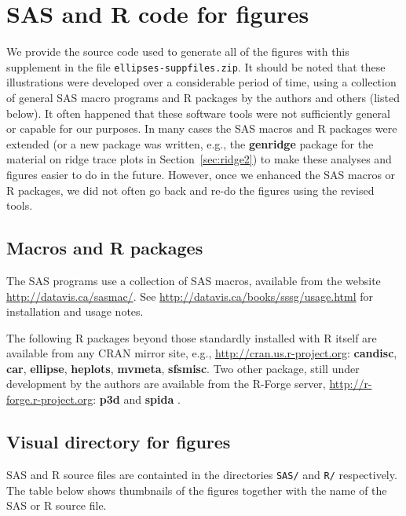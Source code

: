 \documentclass[11pt]{article}%
\newcommand*{\secref}[1]{Section~\ref{#1}}
\newcommand*{\pkg}[1]{\textbf{#1}}     %
\newcommand*{\file}[1]{\texttt{#1}}     %
\begin{document}
\section{SAS and R code for figures}\label{sec:SASandR}

We provide the source code used to generate all of the figures with this supplement in the file
\newline
\file{ellipses-suppfiles.zip}.
It should
be noted that these illustrations were developed over a considerable period of time, using a collection
of general SAS macro programs and R packages by the authors and others (listed below). It often happened
that these software tools were not sufficiently general or capable for our purposes.  In many cases the
SAS macros and R packages were extended (or a new package was written, e.g., 
the \pkg{genridge} package \citep{genridge,Friendly:genridge:2012} for the material on ridge trace plots in
\secref{sec:ridge2})
to make these analyses and figures easier to do in the future. However, once we enhanced the SAS macros
or R packages, we did not often go back and re-do the figures using the revised tools.  

\subsection{Macros and R packages}
The SAS programs use a collection of SAS macros, available from the website \url{http://datavis.ca/sasmac/}.
See  \url{http://datavis.ca/books/sssg/usage.html} for installation and usage notes.

The following R packages beyond those standardly installed with R itself are available from any
CRAN mirror site, e.g., \url{http://cran.us.r-project.org}:
\pkg{candisc}, \pkg{car}, \pkg{ellipse}, \pkg{heplots}, \pkg{mvmeta}, \pkg{sfsmisc}.
Two other package, still under development by the authors are available from the R-Forge server,
\url{http://r-forge.r-project.org}: \pkg{p3d} \citep{p3d} and \pkg{spida} \citep{spida}.

\subsection{Visual directory for figures}
SAS and R source files are containted in the directories \file{SAS/} and \file{R/} respectively.
The table below shows thumbnails of the figures together with the name of the SAS or R source file.
\newcommand{\Figure}[3]{%
  \begin{tabular}[b]{c}
    Fig. #1 \\\textbf{#3} \\ \texttt{[image: \#2]} 
\end{tabular} 
}
\end{document}
